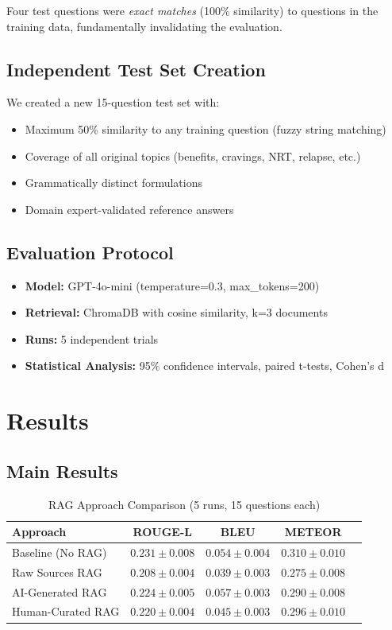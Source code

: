 \documentclass{article}
\begin{document}
Four test questions were \textit{exact matches} (100\% similarity) to questions in the training data, fundamentally invalidating the evaluation.

\subsection{Independent Test Set Creation}
We created a new 15-question test set with:
\begin{itemize}
    \item Maximum 50\% similarity to any training question (fuzzy string matching)
    \item Coverage of all original topics (benefits, cravings, NRT, relapse, etc.)
    \item Grammatically distinct formulations
    \item Domain expert-validated reference answers
\end{itemize}

\subsection{Evaluation Protocol}
\begin{itemize}
    \item \textbf{Model:} GPT-4o-mini (temperature=0.3, max\_tokens=200)
    \item \textbf{Retrieval:} ChromaDB with cosine similarity, k=3 documents
    \item \textbf{Runs:} 5 independent trials
    \item \textbf{Statistical Analysis:} 95\% confidence intervals, paired t-tests, Cohen's d
\end{itemize}

\section{Results}

\subsection{Main Results}

\begin{table}[h]
\centering
\caption{RAG Approach Comparison (5 runs, 15 questions each)}
\begin{tabular}{lcccc}
\toprule
Approach & ROUGE-L & BLEU & METEOR \\
\midrule
Baseline (No RAG) & $0.231 \pm 0.008$ & $0.054 \pm 0.004$ & $0.310 \pm 0.010$ \\
Raw Sources RAG & $0.208 \pm 0.004$ & $0.039 \pm 0.003$ & $0.275 \pm 0.008$ \\
AI-Generated RAG & $0.224 \pm 0.005$ & $0.057 \pm 0.003$ & $0.290 \pm 0.008$ \\
Human-Curated RAG & $0.220 \pm 0.004$ & $0.045 \pm 0.003$ & $0.296 \pm 0.010$ \\
\bottomrule
\end{tabular}
\label{tab:main_results}
\end{table}
\end{document}
